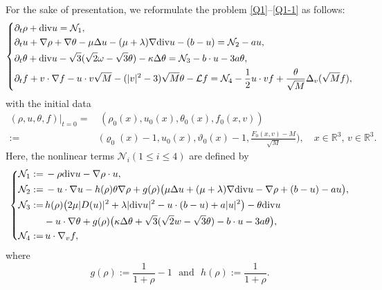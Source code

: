 \documentclass[reqno,11pt]{amsart}
\theoremstyle{plain}
\numberwithin{equation}{section}
\begin{document}
For the sake of presentation,  we reformulate the problem \eqref{Q1}--\eqref{Q1-1}  as  
follows: 
\begin{equation}\label{G3.2}
\left\{\begin{aligned}
&\partial_t \rho  +{\rm div} u=\mathcal{N}_1, \\
&\partial_t u + \nabla \rho+\nabla \theta-\mu\Delta  u-(\mu+\lambda)\nabla{\rm div} u-(b-u)=\mathcal{N}_2-au, \\
&\partial_t \theta + {\rm div} u-\sqrt{3}(\sqrt{2} \omega-\sqrt{3} \theta) -\kappa\Delta \theta = \mathcal{N}_3-b\cdot u-3a\theta,\\
&\partial_t f +v \cdot \nabla f-
u \cdot v \sqrt{M}- (|v|^2-3 ) \sqrt{M} \theta -\mathcal{L} f=\mathcal{N}_4-\frac{1}{2}u\cdot v f+\frac{\theta}{\sqrt{M}}\Delta_v(\sqrt{M}f),\\
\end{aligned}\right.
\end{equation} 
with the initial data
\begin{align}\label{G3.3}
(\rho ,u ,\theta ,f )|_{t=0}=&\,(\rho _0(x),u _0(x),\theta _0(x),f _0(x,v))\nonumber\\
:=&\,\Big( \varrho_0 (x)-1,u _0(x), {\vartheta} _0(x)-1,\frac{F _0(x,v)-M}{\sqrt{M}}\Big), \quad   x \in \mathbb{R}^3, \, v\in\mathbb{R}^3. 
\end{align} 
Here, the nonlinear terms $\mathcal{N}_i(1\leq i\leq 4)$ are defined by
\begin{equation*}
\left\{
\begin{aligned}
\mathcal{N}_1:=&\,-\rho{\rm div} u-\nabla\rho\cdot u, \\
\mathcal{N}_2:=&\,-u\cdot\nabla u-h(\rho) \theta \nabla\rho +g(\rho)\big(\mu\Delta  u+(\mu+\lambda)\nabla{\rm div} u-\nabla\rho+(b-u)-au \big), \\
\mathcal{N}_3:=&\,h(\rho)\big(2\mu|D(u)|^2+\lambda|{\rm div} u|^2 -u\cdot(b-u)+a|u|^2\big)-\theta{\rm div}u\\
&-u\cdot\nabla\theta+ g(\rho)\big(\kappa\Delta \theta+\sqrt{3}(\sqrt{2}w-\sqrt{3}\theta)-b\cdot u-3a\theta\big)   ,\\
\mathcal{N}_4:=&\, u\cdot\nabla_v f, 
\end{aligned}\right.
\end{equation*}
where
\begin{equation}\label{define:g,h}
g(\rho):=  \frac{1}{1+\rho}-1 \ \ \ \text{and} \ \ \
h(\rho):= \frac{1}{1+\rho}.
\end{equation}
\end{document}
